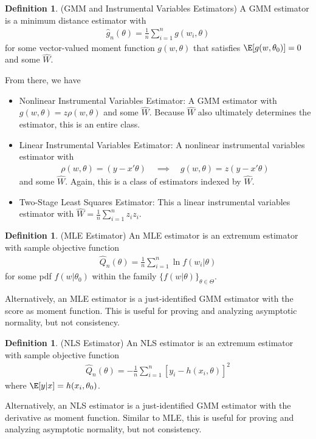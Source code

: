 \documentclass[12pt]{article}
\theoremstyle{plain}
\theoremstyle{definition}
\newtheorem{defn}[thm]{Definition}
\theoremstyle{remark}
\newcommand{\sumin}{\sum^n_{i=1}}
\begin{document}
\begin{defn}(GMM and Instrumental Variables Estimators)
A GMM estimator is a minimum distance estimator with
\begin{align*}
  \widehat{g}_n(\theta)
  =
  \frac{1}{n}
  \sumin
  g(w_i,\theta)
\end{align*}
for some vector-valued moment function $g(w,\theta)$ that satisfies
$\E[g(w,\theta_0)]=0$ and some $\widehat{W}$.

From there, we have
\begin{itemize}
  \item Nonlinear Instrumental Variables Estimator:
    A GMM estimator with $g(w,\theta)=z\rho(w,\theta)$ and some
    $\widehat{W}$.
    Because $\widehat{W}$ also ultimately determines the estimator, this
    is an entire class.
  \item Linear Instrumental Variables Estimator:
    A nonlinear instrumental variables estimator with
    \begin{align*}
      \rho(w,\theta)=(y-x'\theta)
      \quad\implies\quad
      g(w,\theta)= z(y-x'\theta)
    \end{align*}
    and some $\widehat{W}$.
    Again, this is a class of estimators indexed by $\widehat{W}$.
  \item
    Two-Stage Least Squares Estimator:
    This a linear instrumental variables estimator with
    $\widehat{W}=\frac{1}{n}\sumin z_iz_i$.
\end{itemize}
\end{defn}


\begin{defn}(MLE Estimator)
An MLE estimator is an extremum estimator with sample objective function
\begin{align*}
  \widehat{Q}_n(\theta)
  =
  \frac{1}{n}
  \sumin
  \ln f(w_i|\theta)
\end{align*}
for some pdf $f(w|\theta_0)$ within the family
$\{f(w|\theta)\}_{\theta\in\Theta}$.

Alternatively, an MLE estimator is a just-identified GMM estimator with
the score as moment function.
This is useful for proving and analyzing asymptotic normality, but not
consistency.
\end{defn}


\begin{defn}(NLS Estimator)
An NLS estimator is an extremum estimator with sample objective function
\begin{align*}
  \widehat{Q}_n(\theta)
  =
  -
  \frac{1}{n}
  \sumin
  [y_i-h(x_i,\theta)]^2
\end{align*}
where $\E[y|x]=h(x_i,\theta_0)$.

Alternatively, an NLS estimator is a just-identified GMM estimator with
the derivative as moment function.
Similar to MLE, this is useful for proving and analyzing asymptotic
normality, but not consistency.
\end{defn}
\end{document}
